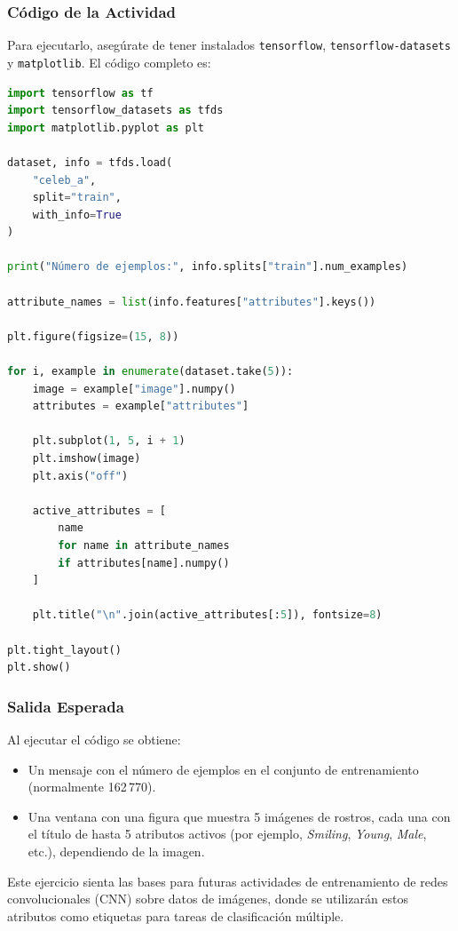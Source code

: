 \documentclass[12pt]{article}
\begin{document}
\subsubsection*{Código de la Actividad}

\noindent Para ejecutarlo, asegúrate de tener instalados \texttt{tensorflow}, \texttt{tensorflow-datasets} y \texttt{matplotlib}. El código completo es:

\begin{lstlisting}[language=Python, caption={Carga y visualización de CelebA con TFDS}, label={lst:celebA}]
import tensorflow as tf
import tensorflow_datasets as tfds
import matplotlib.pyplot as plt

dataset, info = tfds.load(
    "celeb_a",
    split="train",
    with_info=True
)

print("Número de ejemplos:", info.splits["train"].num_examples)

attribute_names = list(info.features["attributes"].keys())

plt.figure(figsize=(15, 8))

for i, example in enumerate(dataset.take(5)):
    image = example["image"].numpy()
    attributes = example["attributes"]

    plt.subplot(1, 5, i + 1)
    plt.imshow(image)
    plt.axis("off")

    active_attributes = [
        name
        for name in attribute_names
        if attributes[name].numpy()
    ]

    plt.title("\n".join(active_attributes[:5]), fontsize=8)

plt.tight_layout()
plt.show()
\end{lstlisting}

\subsubsection*{Salida Esperada}

Al ejecutar el código se obtiene:
\begin{itemize}
    \item Un mensaje con el número de ejemplos en el conjunto de entrenamiento (normalmente 162\,770).
    \item Una ventana con una figura que muestra 5 imágenes de rostros, cada una con el título de hasta 5 atributos activos (por ejemplo, \textit{Smiling}, \textit{Young}, \textit{Male}, etc.), dependiendo de la imagen.
\end{itemize}

Este ejercicio sienta las bases para futuras actividades de entrenamiento de redes convolucionales (CNN) sobre datos de imágenes, donde se utilizarán estos atributos como etiquetas para tareas de clasificación múltiple.
\end{document}
